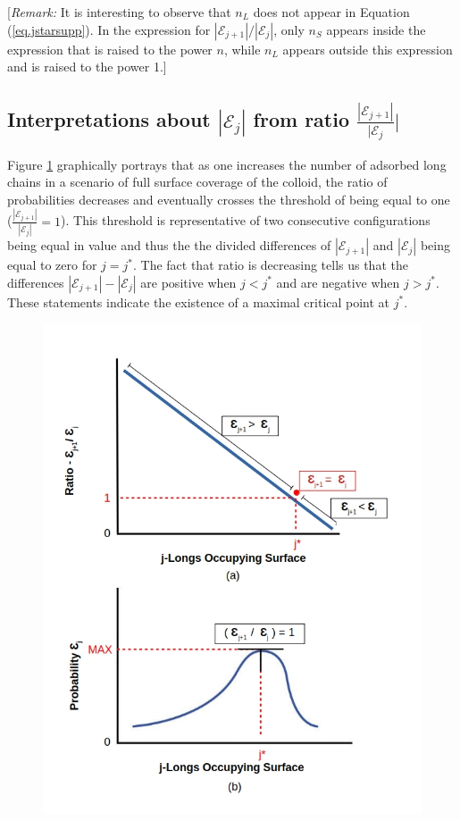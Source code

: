 \documentclass[journal=mamobx,manuscript=article]{achemso}
\begin{document}
[\textit{Remark:}  It is interesting to observe that $n_L$ does not appear in Equation (\ref{eq.jstarsupp}).  
In the expression for $|\mathcal{E}_{j+1}|/|\mathcal{E}_j|$,   only $n_S$ appears inside the 
expression that is raised to the power $n$, while $n_L$ appears outside this expression and is
raised to the power 1.]  

\subsection{Interpretations about $|\mathcal{E}_{j}|$ from ratio $\frac{|\mathcal{E}_{j+1}|}{|\mathcal{E}_{j}}|$}



Figure \ref{figure 9} graphically portrays 
that as one increases the number of adsorbed long chains in a scenario of full surface coverage of the colloid, the ratio of probabilities decreases and 
eventually crosses the threshold of 
being equal to one ($\frac{|\mathcal{E}_{j+1}|}{|\mathcal{E}_{j}|}=1$). 
This threshold is representative of two consecutive configurations being equal in value and thus the the divided differences of $|\mathcal{E}_{j+1}|$ and $|\mathcal{E}_{j}|$ being equal to zero for $j=j^*$.  
The fact that ratio is decreasing tells us that 
the differences $|\mathcal{E}_{j+1}|-|\mathcal{E}_{j}|$
are positive when $j<j^*$ and are negative when $j>j^*$.
These statements indicate the existence of a maximal critical point at $j^*$.

\begin{figure}[H]
\includegraphics[scale=0.50]{Sup_Fig2.jpg}
\caption{}
\label{figure 9}
\end{figure}
\end{document}
